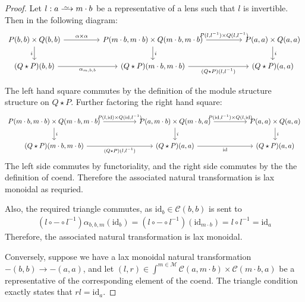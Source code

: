 \documentclass[11pt,a4paper]{amsart}
\theoremstyle{plain}
\theoremstyle{definition}
\newcommand{\id}{\mathrm{id}}
\newcommand{\C}{\mathscr{C}}
\newcommand{\M}{\mathscr{M}}
\newcommand{\isoto}{\xrightarrow{
   \,\smash{\raisebox{-0.65ex}{\ensuremath{\scriptstyle\sim}}}\,}}
\begin{document}
\begin{proof}
Let $l : a \isoto m \cdot b$ be a representative of a lens such that $l$ is invertible. Then in the following diagram:
\[
\begin{tikzcd}[column sep=huge]
P(b, b) \times Q(b, b) \ar[d, "i" left ] \ar[r, "\alpha \times \alpha" above] & P(m\cdot b, m\cdot b) \times Q(m\cdot b, m\cdot b) \ar[d, "i"] \ar[r, "{P(l, l^{-1})\times Q(l, l^{-1})}" above] & P(a, a) \times Q(a, a) \ar[d, "i"] \\
(Q\star P)(b, b) \ar[r, "\alpha_{m,b,b}" below] & (Q\star P)(m\cdot b, m\cdot b) \ar[r, "{(Q\star P)(l, l^{-1})}" below] & (Q\star P)(a, a)
\end{tikzcd}
\]

The left hand square commutes by the definition of the module structure structure on $Q\star P$. Further factoring the right hand square:
\[
\begin{tikzcd}[column sep=huge]
P(m\cdot b, m\cdot b) \times Q(m\cdot b, m\cdot b) \ar[d, "i"] \ar[r, "{P(l, \id)\times Q(\id, l^{-1})}" above] & P(a, m\cdot b) \times Q(m\cdot b, a) \ar[d, "i"] \ar[r, "{P(\id, l^{-1})\times Q(l, \id)}" above] & P(a, a) \times Q(a, a) \ar[d, "i"] \\
(Q\star P)(m\cdot b, m\cdot b) \ar[r, "{(Q\star P)(l, l^{-1})}" below] & (Q\star P)(a, a) \ar[r, "\id" below] &(Q\star P)(a, a)
\end{tikzcd}
\]
The left side commutes by functoriality, and the right side commutes by the the definition of coend. Therefore the associated natural transformation is lax monoidal as requried.

Also, the required triangle commutes, as $\id_b \in \C(b,b)$ is sent to 
\begin{align*}
(l \circ - \circ l^{-1})\alpha_{b,b,m}(\id_b) = (l \circ - \circ l^{-1})(\id_{m\cdot b}) = l \circ l^{-1} = \id_a
\end{align*}
Therefore, the associated natural transformation is lax monoidal.

Conversely, suppose we have a lax monoidal natural transformation $-(b, b) \to -(a, a)$, and let $(l, r) \in \int^{m \in \M} \C(a, m \cdot b) \times \C(m \cdot b, a)$ be a representative of the corresponding element of the coend. The triangle condition exactly states that $rl = \id_a$.


\end{proof}
\end{document}
